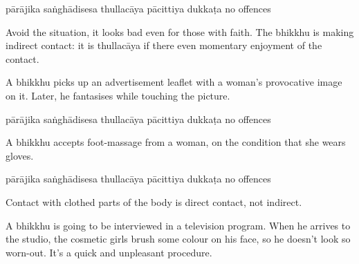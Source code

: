 \begin{exam}{\autoExamName}
\begin{problem*}
\begin{parts}
  \bigskip

  \begin{answers}{6}
    \bChoices
     pārājika\eAns
     saṅghādisesa\eAns
     thullacāya\eAns
     pācittiya\eAns
     dukkaṭa\eAns
     no offences\eAns
    \eChoices
  \end{answers}

  \begin{solution}
    Avoid the situation, it looks bad even for those with faith. The bhikkhu is
    making indirect contact: it is thullacāya if there even momentary enjoyment
    of the contact.
  \end{solution}

  \bigskip

  \item A bhikkhu picks up an advertisement leaflet with a woman's provocative
    image on it. Later, he fantasises while touching the picture.

  \bigskip

  \begin{answers}{6}
    \bChoices
     pārājika\eAns
     saṅghādisesa\eAns
     thullacāya\eAns
     pācittiya\eAns
     dukkaṭa\eAns
     no offences\eAns
    \eChoices
  \end{answers}

  \bigskip

  \item A bhikkhu accepts foot-massage from a woman, on the condition that she wears gloves.

  \bigskip

  \begin{answers}{6}
    \bChoices
     pārājika\eAns
     saṅghādisesa\eAns
     thullacāya\eAns
     pācittiya\eAns
     dukkaṭa\eAns
     no offences\eAns
    \eChoices
  \end{answers}

  \begin{solution}
    Contact with clothed parts of the body is direct contact, not indirect.
  \end{solution}

  \bigskip

  \item A bhikkhu is going to be interviewed in a television program. When he
    arrives to the studio, the cosmetic girls brush some colour on his face, so he
    doesn't look so worn-out. It's a quick and unpleasant procedure.


\end{parts}
\end{problem*}
\end{exam}
